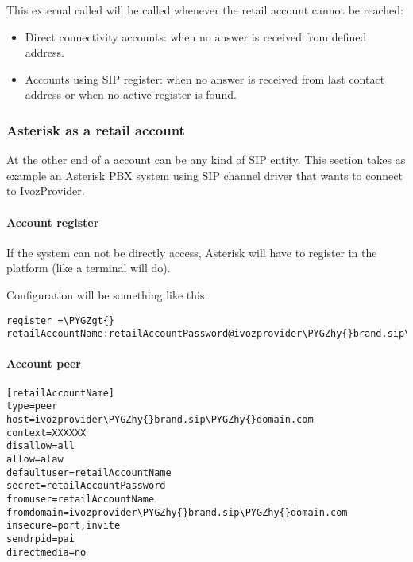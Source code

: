 \documentclass[letterpaper,10pt,english]{sphinxmanual}
\def\PYGZgt{\char`\>}
\def\PYGZhy{\char`\-}
\begin{document}
This external called will be called whenever the retail account cannot be reached:
\begin{itemize}
\item {} 
Direct connectivity accounts: when no answer is received from defined address.

\item {} 
Accounts using SIP register: when no answer is received from last contact address or when no active register is found.

\end{itemize}


\subsubsection{Asterisk as a retail account}
\label{administration_portal/client/retail/retail_accounts:asterisk-as-a-retail-account}
At the other end of a account can be any kind of SIP entity. This section takes
as example an Asterisk PBX system using SIP channel driver that wants to connect
to IvozProvider.


\paragraph{Account register}
\label{administration_portal/client/retail/retail_accounts:account-register}
If the system can not be directly access, Asterisk will have to register in the
platform (like a terminal will do).

Configuration will be something like this:

\begin{Verbatim}[commandchars=\\\{\}]
register =\PYGZgt{} retailAccountName:retailAccountPassword@ivozprovider\PYGZhy{}brand.sip\PYGZhy{}domain.com
\end{Verbatim}


\paragraph{Account peer}
\label{administration_portal/client/retail/retail_accounts:account-peer}
\begin{Verbatim}[commandchars=\\\{\}]
[retailAccountName]
type=peer
host=ivozprovider\PYGZhy{}brand.sip\PYGZhy{}domain.com
context=XXXXXX
disallow=all
allow=alaw
defaultuser=retailAccountName
secret=retailAccountPassword
fromuser=retailAccountName
fromdomain=ivozprovider\PYGZhy{}brand.sip\PYGZhy{}domain.com
insecure=port,invite
sendrpid=pai
directmedia=no
\end{Verbatim}
\end{document}
